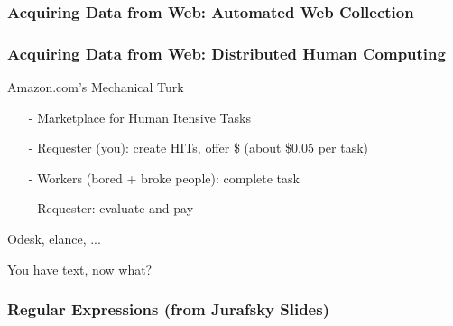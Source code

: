 \documentclass{beamer}
\numberwithin{equation}{section}
\begin{document}
\begin{frame}
\frametitle{Acquiring Data from Web: Automated Web Collection}



\end{frame}


\begin{frame}
\frametitle{Acquiring Data from Web: Distributed Human Computing}
Amazon.com's \alert{Mechanical Turk}

\begin{itemize}
\item[-] Marketplace for \alert{H}uman \alert{I}tensive \alert{T}asks
\item[-] Requester (you): create HITs, offer \$ (about \$0.05 per task)
\item[-] Workers (bored + broke people): complete task
\item[-] Requester: evaluate and pay
\end{itemize}

Odesk, elance, ...


\end{frame}



\begin{frame}

\huge
You have text, now what?


\end{frame}


\begin{frame}
\frametitle{Regular Expressions (from Jurafsky Slides) }

\begin{center}
\end{center}


\end{frame}
\end{document}

